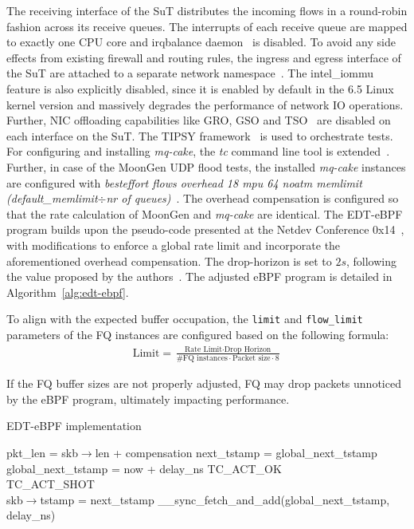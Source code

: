 The receiving interface of the SuT distributes the incoming flows in a round-robin fashion across its receive queues.
%
The interrupts of each receive queue are mapped to exactly one CPU core and irqbalance daemon~\cite{irqbalance} is disabled.
%
To avoid any side effects from existing firewall and routing rules, the ingress and egress interface of the SuT are attached to a separate network namespace~\cite{network-namespace}.
%
The intel\_iommu~\cite{iommu} feature is also explicitly disabled, since it is enabled by default in the 6.5 Linux kernel version and massively degrades the performance of network IO operations.
%
Further, NIC offloading capabilities like GRO, GSO and TSO~\cite{offloads} are disabled on each interface on the SuT.
%
The TIPSY framework~\cite{tipsy} is used to orchestrate tests.
%
For configuring and installing \textit{mq-cake}, the \textit{tc} command line tool is extended~\cite{mq-cake-iproute}.
%
Further, in case of the MoonGen UDP flood tests, the installed \textit{mq-cake} instances are configured with \textit{besteffort flows overhead 18 mpu 64 noatm memlimit (default\_memlimit$\div$nr of queues)}~\cite{cake-manual}.
%
The overhead compensation is configured so that the rate calculation of MoonGen and \textit{mq-cake} are identical.
%
The EDT-eBPF program builds upon the pseudo-code presented at the Netdev Conference 0x14~\cite{edt-ebpf}, with modifications to enforce a global rate limit and incorporate the aforementioned overhead compensation.
%
The drop-horizon is set to $2s$, following the value proposed by the authors~\cite{edt-ebpf}. The adjusted eBPF program is detailed in Algorithm~\ref{alg:edt-ebpf}.

To align with the expected buffer occupation, the \lstinline{limit} and \lstinline{flow_limit} parameters of the FQ instances are configured based on the following formula:
\begin{align*}
    \text{Limit} = \frac{\text{Rate Limit}\cdot \text{Drop Horizon}}{\text{\# FQ instances}\cdot \text{Packet size} \cdot 8}
\end{align*}

If the FQ buffer sizes are not properly adjusted, FQ may drop packets unnoticed by the eBPF program, ultimately impacting performance.

\begin{algorithm}[t]
    \caption{EDT-eBPF implementation}\label{alg:edt-ebpf}
\begin{algorithmic}[1]
    \State pkt\_len = skb$\rightarrow$len + compensation
    \State next\_tstamp = global\_next\_tstamp
    \\
        \State global\_next\_tstamp = now + delay\_ns
        \State \Return TC\_ACT\_OK
    \EndIf
    \\
        \State \Return TC\_ACT\_SHOT
    \EndIf
    \\
    \State skb$\rightarrow$tstamp = next\_tstamp
    \State \_\_sync\_fetch\_and\_add(global\_next\_tstamp, delay\_ns)
\EndProcedure
\end{algorithmic}
\end{algorithm}

